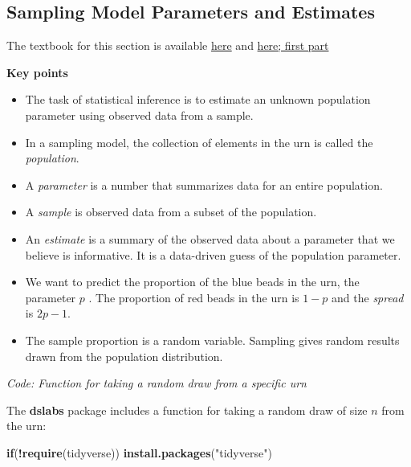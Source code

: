 \documentclass[
]{article}
\newenvironment{Shaded}{\begin{snugshade}}{\end{snugshade}}
\newcommand{\ControlFlowTok}[1]{\textcolor[rgb]{0.13,0.29,0.53}{\textbf{#1}}}
\newcommand{\KeywordTok}[1]{\textcolor[rgb]{0.13,0.29,0.53}{\textbf{#1}}}
\newcommand{\NormalTok}[1]{#1}
\newcommand{\OperatorTok}[1]{\textcolor[rgb]{0.81,0.36,0.00}{\textbf{#1}}}
\newcommand{\StringTok}[1]{\textcolor[rgb]{0.31,0.60,0.02}{#1}}
\providecommand{\tightlist}{%
  \setlength{\itemsep}{0pt}\setlength{\parskip}{0pt}}
\begin{document}
\hypertarget{sampling-model-parameters-and-estimates}{%
\subsection{Sampling Model Parameters and
Estimates}\label{sampling-model-parameters-and-estimates}}

The textbook for this section is available
\href{https://rafalab.github.io/dsbook/inference.html\#the-sampling-model-for-polls}{here}
and
\href{https://rafalab.github.io/dsbook/inference.html\#populations-samples-parameters-and-estimates}{here;
first part}

\textbf{Key points}

\begin{itemize}
\tightlist
\item
  The task of statistical inference is to estimate an unknown population
  parameter using observed data from a sample.
\item
  In a sampling model, the collection of elements in the urn is called
  the \emph{population}.
\item
  A \emph{parameter} is a number that summarizes data for an entire
  population.
\item
  A \emph{sample} is observed data from a subset of the population.
\item
  An \emph{estimate} is a summary of the observed data about a parameter
  that we believe is informative. It is a data-driven guess of the
  population parameter.
\item
  We want to predict the proportion of the blue beads in the urn, the
  parameter \(p\) . The proportion of red beads in the urn is \(1 - p\)
  and the \emph{spread} is \(2p - 1\).
\item
  The sample proportion is a random variable. Sampling gives random
  results drawn from the population distribution.
\end{itemize}

\emph{Code: Function for taking a random draw from a specific urn}

The \textbf{dslabs} package includes a function for taking a random draw
of size \(n\) from the urn:

\begin{Shaded}
\begin{Highlighting}[]
\ControlFlowTok{if}\NormalTok{(}\OperatorTok{!}\KeywordTok{require}\NormalTok{(tidyverse)) }\KeywordTok{install.packages}\NormalTok{(}\StringTok{"tidyverse"}\NormalTok{)}
\end{Highlighting}
\end{Shaded}
\end{document}
